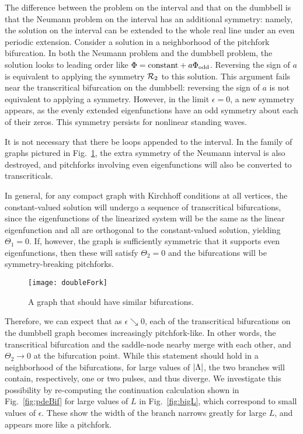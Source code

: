 \documentclass{article}
\numberwithin{equation}{section}
\numberwithin{figure}{section}
\begin{document}
The difference between the problem on the interval and that on the dumbbell is that the Neumann problem on the interval has an additional symmetry: namely, the solution on the interval can be extended to the whole real line under an even periodic extension. Consider a solution in a neighborhood of the pitchfork bifurcation. In both the Neumann problem and the dumbbell problem, the solution looks to leading order like $\Phi = \text{constant} + a \Phi_{\rm odd}$. Reversing the sign of $a$ is equivalent to applying the symmetry $\mathcal{R}_2$ to this solution. This argument fails near the transcritical bifurcation on the dumbbell: reversing the sign of $a$ is not equivalent to applying a symmetry. However, in the limit $\epsilon=0$, a new symmetry appears, as the evenly extended eigenfunctions have an odd symmetry about each of their zeros. This symmetry persists for  nonlinear standing waves. 

It is not necessary that there be loops appended to the interval. In the family of graphs  pictured in Fig.~\ref{fig:doublefork}, the extra symmetry of the Neumann interval is also destroyed, and pitchforks involving even eigenfunctions will also be converted to transcriticals. 

In general, for any compact graph with Kirchhoff conditions at all vertices, the constant-valued solution will undergo a sequence of transcritical bifurcations, since the eigenfunctions of the linearized system will be the same as the linear eigenfunction and all are orthogonal to the constant-valued solution, yielding $\Theta_1=0$. If, however, the graph is sufficiently symmetric that it supports even eigenfunctions, then these will satisfy $\Theta_2=0$ and the bifurcations will be symmetry-breaking pitchforks.

\begin{figure}[htbp] %
   \centering
   \texttt{[image: doubleFork]} 
   \caption{A graph that should have similar bifurcations.}
\label{fig:doublefork}
\end{figure}

Therefore, we can expect that as $\epsilon \searrow 0$, each of the transcritical bifurcations on the dumbbell graph becomes increasingly pitchfork-like. In other words, the transcritical bifurcation and the saddle-node nearby merge with each other, and $\Theta_2 \to 0$ at the bifurcation point. While this statement should hold in a neighborhood of the bifurcations, for large values of $\left\lvert\Lambda\right\rvert$, the two branches will contain, respectively, one or two pulses, and thus diverge. We investigate this possibility by re-computing the continuation calculation shown in Fig.~\ref{fig:pdeBif} for large values of $L$ in Fig.~\ref{fig:bigL}, which correspond to small values of $\epsilon$. These show the width of the branch narrows greatly for large $L$, and appears more like a pitchfork.
\end{document}
